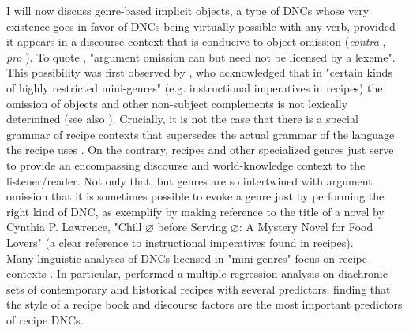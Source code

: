 I will now discuss genre-based implicit objects, a type of DNCs whose very existence goes in favor of DNCs being virtually possible with any verb, provided it appears in a discourse context that is conducive to object omission (\textit{contra} \textcite[55]{TonelliDelmonte2011}, \textit{pro} \textcite{Goldberg2001}). To quote \textcite[175]{RuppenhoferMichaelis2010}, "argument omission can but need not be licensed by a lexeme". This possibility was first observed by \textcite[95]{Fillmore1986}, who acknowledged that in "certain kinds of highly restricted mini-genres" (e.g. instructional imperatives in recipes) the omission of objects and other non-subject complements is not lexically determined (see also \textcite[237]{Haegeman1987}). Crucially, it is not the case that there is a special grammar of recipe contexts that supersedes the actual grammar of the language the recipe uses \parencite{Culy1996, Cote1996}. On the contrary, recipes and other specialized genres just serve to provide an encompassing discourse and world-knowledge context to the listener/reader. Not only that, but genres are so intertwined with argument omission that it is sometimes possible to evoke a genre just by performing the right kind of DNC, as \textcite[159]{RuppenhoferMichaelis2010} exemplify by making reference to the title of a novel by Cynthia P. Lawrence, "Chill $\varnothing$ before Serving $\varnothing$: A Mystery Novel for Food Lovers" (a clear reference to instructional imperatives found in recipes).\\
Many linguistic analyses of DNCs licensed in "mini-genres" focus on recipe contexts \parencite{Ahringberg2015, Garcia-VelascoMunoz2002, Megitt2019, Ruda2014, MassamRoberge1989, Bender, Culy1996}. In particular, \textcite{Culy1996} performed a multiple regression analysis on diachronic sets of contemporary and historical recipes with several predictors, finding that the style of a recipe book and discourse factors are the most important predictors of recipe DNCs.\\
